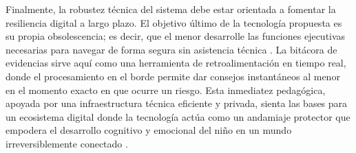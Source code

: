 Finalmente, la robustez técnica del sistema debe estar orientada a fomentar la resiliencia digital a largo plazo. El objetivo último de la tecnología propuesta es su propia obsolescencia; es decir, que el menor desarrolle las funciones ejecutivas necesarias para navegar de forma segura sin asistencia técnica \cite{clemente-suarez_digital_2024}. La bitácora de evidencias sirve aquí como una herramienta de retroalimentación en tiempo real, donde el procesamiento en el borde permite dar consejos instantáneos al menor en el momento exacto en que ocurre un riesgo. Esta inmediatez pedagógica, apoyada por una infraestructura técnica eficiente y privada, sienta las bases para un ecosistema digital donde la tecnología actúa como un andamiaje protector que empodera el desarrollo cognitivo y emocional del niño en un mundo irreversiblemente conectado \cite{holmarsdottir_integrative_2025, sahu_edge_2025}.\\